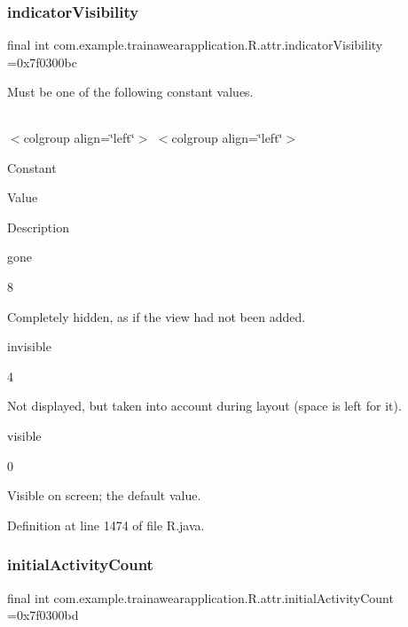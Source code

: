 \subsubsection{\texorpdfstring{indicatorVisibility}{indicatorVisibility}}
{\footnotesize\ttfamily final int com.\+example.\+trainawearapplication.\+R.\+attr.\+indicator\+Visibility =0x7f0300bc\hspace{0.3cm}{\ttfamily [static]}}

Must be one of the following constant values.

\tabulinesep=1mm
\begin{longtabu}spread 0pt [c]{*{0}{|X[-1]}|}
\hline
\end{longtabu}
$<$colgroup align=\char`\"{}left\char`\"{}$>$ $<$colgroup align=\char`\"{}left\char`\"{}$>$ 

Constant

Value

Description 

gone

8

Completely hidden, as if the view had not been added. 

invisible

4

Not displayed, but taken into account during layout (space is left for it). 

visible

0

Visible on screen; the default value. 

Definition at line 1474 of file R.\+java.

\mbox{\label{classcom_1_1example_1_1trainawearapplication_1_1_r_1_1attr_a25a83d8b3679480c75ced039a9564cb0}} 
\subsubsection{\texorpdfstring{initialActivityCount}{initialActivityCount}}
{\footnotesize\ttfamily final int com.\+example.\+trainawearapplication.\+R.\+attr.\+initial\+Activity\+Count =0x7f0300bd\hspace{0.3cm}{\ttfamily [static]}}


